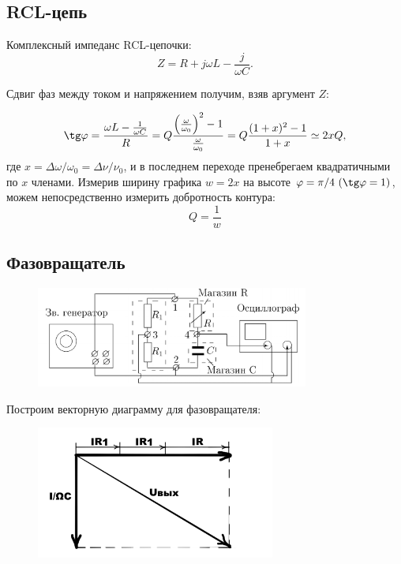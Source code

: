 \documentclass[a4paper, 12pt]{article}
\begin{document}
\subsection*{RCL-цепь}

Комплексный импеданс RCL-цепочки:
$$Z=R+j\omega L - \frac{j}{\omega C}.$$

Сдвиг фаз между током и напряжением получим, взяв аргумент $Z$:

$$\tg\varphi = \frac{\omega L - \frac{1}{\omega C}}{R} = Q\frac{\left(\frac{\omega}{\omega_0}\right)^2 - 1}{\frac{\omega}{\omega_0}} = Q\frac{(1+x)^2-1}{1+x} \simeq 2x Q,$$
где $x = \Delta \omega / \omega_0 = \Delta \nu / \nu_0$, и в последнем переходе пренебрегаем квадратичными по $x$ членами.
Измерив ширину графика $w=2x$ на высоте $\varphi = \pi / 4\ (\tg\varphi = 1)$, можем непосредственно измерить добротность контура:
$$Q = \frac{1}{w}$$

\subsection*{Фазовращатель}

\begin {figure}[H]
\begin{center}
\includegraphics[width=0.8\textwidth]{phase.png}
\end{center}
\end {figure}

Построим векторную диаграмму для фазовращателя:
\begin {figure}[H]
\begin{center}
\includegraphics[width=0.7\textwidth]{diagram}
\end{center}
\end {figure}
\end{document}

